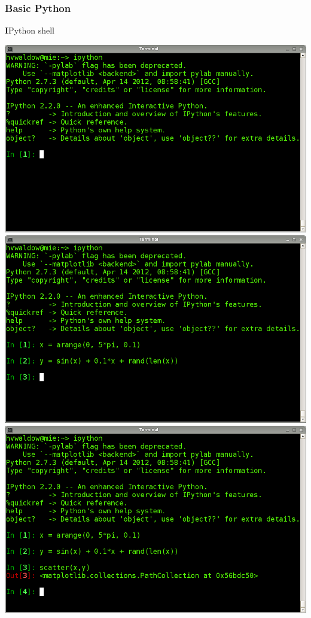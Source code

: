 \documentclass[xcolor=pdftex,dvipsnames,table]{beamer}
\begin{document}
\begin{frame}
  \frametitle{Basic Python}
  \begin{block}{\textbf{I}Python shell}
    \begin{overprint}
    \includegraphics[width=\textwidth, height=0.75\textheight]{ipython1.png}
    \includegraphics[width=\textwidth, height=0.75\textheight]{ipython2.png}
    \includegraphics[width=\textwidth, height=0.75\textheight]{ipython3.png}

\end{overprint}
\end{block}
\end{frame}
\end{document}
